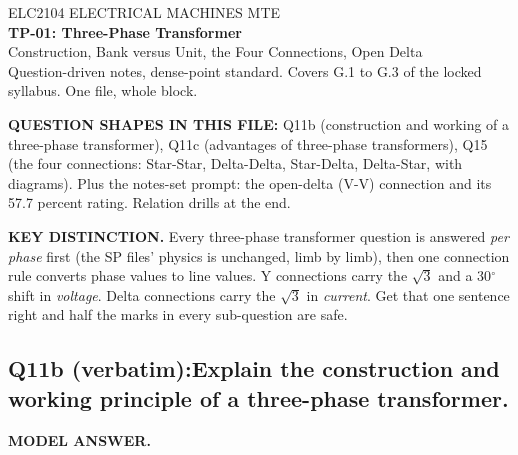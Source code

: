 \documentclass[11pt]{article}
\newcommand{\qhead}[2]{\subsection*{\color{copper}#1\quad\color{iron}#2}}
\newcommand{\tagline}[1]{\textbf{\color{copper}#1}}
\newcommand{\keydist}[1]{\vspace{2pt}\textbf{\color{red}KEY DISTINCTION.} #1}
\begin{document}
\begin{center}
{\footnotesize\color{copper} ELC2104 \textbar{} ELECTRICAL MACHINES \textbar{} MTE}\\[6pt]
{\LARGE\bfseries\color{iron} TP-01: Three-Phase Transformer}\\[2pt]
{\Large\color{copper} Construction, Bank versus Unit, the Four Connections, Open Delta}\\[6pt]
{\footnotesize\color{muted} Question-driven notes, dense-point standard. Covers G.1 to G.3 of the locked syllabus. One file, whole block.}
\end{center}

\vspace{2pt}
\tagline{QUESTION SHAPES IN THIS FILE:} Q11b (construction and working of a three-phase transformer), Q11c (advantages of three-phase transformers), Q15 (the four connections: Star-Star, Delta-Delta, Star-Delta, Delta-Star, with diagrams). Plus the notes-set prompt: the open-delta (V-V) connection and its 57.7 percent rating. Relation drills at the end.
\vspace{2pt}

\keydist{Every three-phase transformer question is answered \emph{per phase} first (the SP files' physics is unchanged, limb by limb), then one connection rule converts phase values to line values. Y connections carry the $\sqrt{3}$ and a 30$^\circ$ shift in \emph{voltage}. Delta connections carry the $\sqrt{3}$ in \emph{current}. Get that one sentence right and half the marks in every sub-question are safe.}

\hrulefill

\qhead{Q11b (verbatim):}{Explain the construction and working principle of a three-phase transformer.}

\tagline{MODEL ANSWER.}
\end{document}
